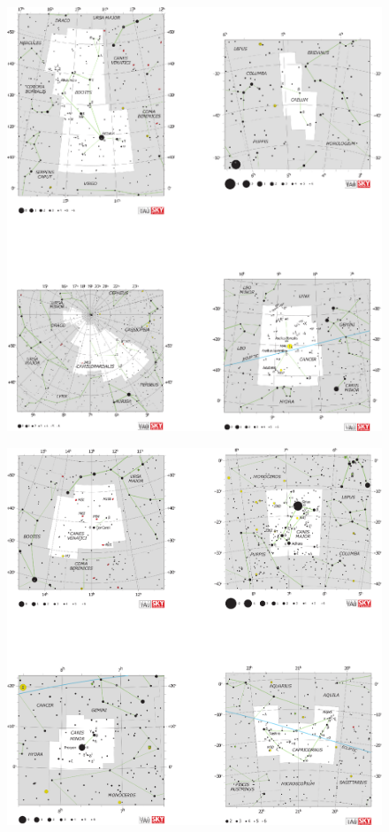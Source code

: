 \documentclass[a4paper,12pt]{extarticle}
\begin{document}
\clearpage
\begin{figure}
    \centering
    \includegraphics[width=\linewidth]{C3.eps}
\end{figure}
\clearpage
\begin{figure}
    \centering
    \includegraphics[width=\linewidth]{C4.eps}
\end{figure}
\end{document}

